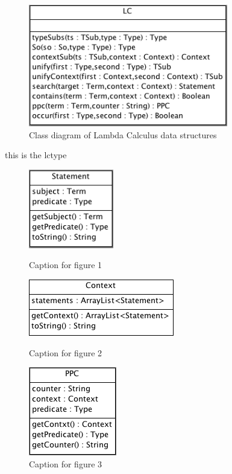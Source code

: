 \documentclass[a4paper,11pt,twoside]{report}
\begin{document}
\begin{figure}
\centering
\includegraphics[scale=0.6]{LCType}
\caption{Class diagram of Lambda Calculus data structures}
\label{fig:term1}
\end{figure}
this is the lctype



\begin{figure}
\centering
\begin{minipage}{.3\textwidth}
\centering
\includegraphics[scale=0.8]{Statement}
\caption{Caption for figure 1}
\label{fig:test1}
\end{minipage}\hfill
\begin{minipage}{.3\textwidth}
\centering
\includegraphics[scale=0.65]{Context}
\caption{Caption for figure 2}
\label{fig:test2}
\end{minipage}\hfill
\begin{minipage}{.3\textwidth}
\centering
\includegraphics[scale=0.7]{PPC}
\caption{Caption for figure 3}
\label{fig:test3}
\end{minipage}
\end{figure}
\end{document}
